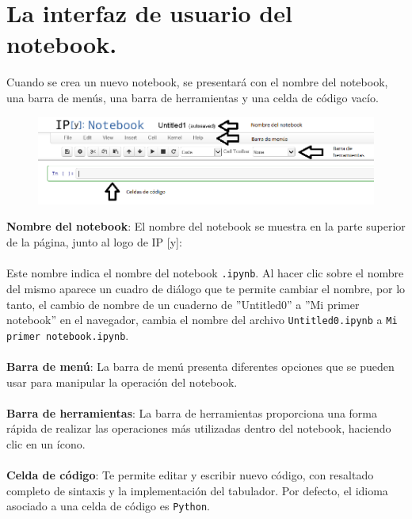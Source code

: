 \documentclass[12pt]{article}
\newcommand{\python}{\texttt{Python}}
\begin{document}
\section{La interfaz de usuario del notebook.}
Cuando se crea un nuevo notebook, se presentará con el nombre del notebook, una barra de menús, una barra de herramientas y una celda de código vacío. 
\begin{figure}[H]
	\centering
	\includegraphics[scale=0.6]{Imagenes/ipython_notebook_04.png} 
\end{figure}
\textbf{Nombre del notebook}: El nombre del notebook se muestra en la parte superior de la página, junto al logo de  IP [y]:
\\
\\
Este nombre indica el nombre del notebook \texttt{.ipynb}. Al hacer clic sobre el nombre del mismo aparece un cuadro de diálogo que te permite cambiar el nombre, por lo tanto, el cambio de nombre de un cuaderno de ''Untitled0'' a ''Mi primer notebook'' en el navegador, cambia el nombre del archivo \texttt{Untitled0.ipynb} a  \texttt{Mi primer notebook.ipynb}.
\\
\\
\textbf{Barra de menú}: La barra de menú presenta diferentes opciones que se pueden usar para manipular la operación del notebook. 
\\
\\
\textbf{Barra de herramientas}: La barra de herramientas proporciona una forma rápida de realizar las operaciones más utilizadas dentro del notebook, haciendo clic en un ícono. 
\\
\\
\textbf{Celda de código}: Te permite editar y escribir nuevo código, con resaltado completo de sintaxis  y la implementación del tabulador. Por defecto, el idioma asociado a una celda de código es \python.
\end{document}

